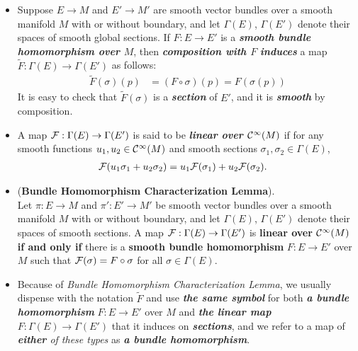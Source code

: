 \documentclass[11pt]{article}
\begin{document}
\begin{itemize}
\item \begin{definition}
Suppose $E \rightarrow M$ and $E' \rightarrow M'$ are smooth vector bundles over a smooth manifold $M$ with or without boundary, and let $\Gamma(E)$, $\Gamma(E')$ denote their spaces of smooth global sections. If $F: E \rightarrow E'$ is a \emph{\textbf{smooth bundle homomorphism over $M$}}, then \emph{\textbf{composition with $F$}} \textit{\textbf{induces}} a map $\widetilde{F}: \Gamma(E) \rightarrow \Gamma(E')$ as follows:
\begin{align}
\widetilde{F}(\sigma)(p) &= (F \circ \sigma)(p) = F(\sigma(p)) \label{eqn: bundle_homomorphism_induced_map}
\end{align}
It is easy to check that $\widetilde{F}(\sigma)$ is a \emph{\textbf{section}} of $E'$, and it is \emph{\textbf{smooth}} by composition.
\end{definition}

\item \begin{definition}
A map ${\mathcal F}: \Gamma(E) \rightarrow \Gamma(E')$ is said to be \emph{\textbf{linear over ${\mathcal C}^{\infty}(M)$}} if for any smooth functions $u_1,u_2 \in {\mathcal C}^{\infty}(M)$ and smooth sections $\sigma_1, \sigma_2 \in \Gamma(E)$,
\begin{align*}
{\mathcal F}(u_1\sigma_1 + u_2\sigma_2) &= u_1 {\mathcal F}(\sigma_1) + u_2{\mathcal F}(\sigma_2).
\end{align*}
\end{definition}

\item
\begin{lemma} (\textbf{Bundle Homomorphism Characterization Lemma}). \citep{lee2003introduction}\\
Let $\pi: E \rightarrow M$ and $\pi': E' \rightarrow M'$ be smooth vector bundles over a smooth manifold $M$ with or without boundary, and let $\Gamma(E)$, $\Gamma(E')$ denote their spaces of smooth sections. A map ${\mathcal F}: \Gamma(E) \rightarrow \Gamma(E')$ is \textbf{linear over ${\mathcal C}^{\infty}(M)$} \textbf{if and only if} there is a \textbf{smooth bundle homomorphism} $F: E \rightarrow E'$ over $M$ such that ${\mathcal F}(\sigma) = F\circ \sigma$ for all $\sigma \in \Gamma(E)$.
\end{lemma}

\item \begin{remark}
Because of \emph{Bundle Homomorphism Characterization Lemma}, we usually dispense with the notation $\widetilde{F}$ and use \emph{\textbf{the same symbol}} for both \emph{\textbf{a bundle homomorphism}} $F: E \rightarrow E'$ over $M$ and \emph{\textbf{the linear map}} $F: \Gamma(E) \rightarrow \Gamma(E')$ that it induces on \emph{\textbf{sections}}, and we refer to a map of \emph{\textbf{either} of these types} as \emph{\textbf{a bundle homomorphism}}.
\end{remark}
\end{itemize}
\end{document}
